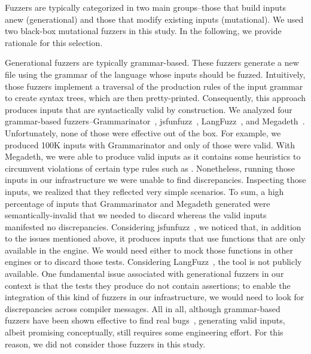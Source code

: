 \documentclass[10pt,conference,anonymous]{IEEEtran}
\begin{document}

Fuzzers are typically categorized in two main groups--those that build
inputs anew (generational) and those that modify existing inputs
(mutational). We used two black-box mutational
fuzzers
in this study. In the following, we provide rationale for this
selection.

Generational fuzzers are typically grammar-based. These fuzzers
generate a new file using the grammar of the language whose inputs
should be fuzzed. Intuitively, those fuzzers implement a traversal of
the production rules of the input grammar to create syntax trees,
which are then pretty-printed. Consequently, this approach produces
inputs that are syntactically valid by construction. We analyzed four
grammar-based fuzzers--Grammarinator~\cite{grammarinator},
jsfunfuzz~\cite{jsfunfuzz},
LangFuzz~\cite{Holler:2012:FCF:2362793.2362831}, and
Megadeth~\cite{grieco2016quickfuzz}.  Unfortunately, none of those
were effective out of the box. For example, we produced 100K inputs
with Grammarinator and only  of those were valid. With
Megadeth, we were able to produce   valid inputs as it
contains some heuristics to circumvent violations of certain type
rules such as . Nonetheless,
running those inputs in our infrastructure we were unable to find
discrepancies. Inspecting those inputs, we realized that they reflected
very simple scenarios. To sum, a high percentage of inputs that
Grammarinator and Megadeth generated were semantically-invalid that we
needed to discard whereas the valid inputs manifested no
discrepancies. Considering jsfunfuzz~\cite{jsfunfuzz}, we noticed
that, in addition to the issues mentioned above, it produces inputs
that use functions that are only available in the \smonkey{}
engine. We would need either to mock those functions in other engines
or to discard those tests. Considering
LangFuzz~\cite{Holler:2012:FCF:2362793.2362831}, the tool is not
publicly available. One fundamental issue associated with generational
fuzzers in our context is that the tests they produce do not contain
assertions; to enable the integration of this kind of fuzzers in our
infrastructure, we would need to look for discrepancies across
compiler messages.  All in all, although grammar-based fuzzers have
been shown effective to find real
bugs~\cite{Holler:2012:FCF:2362793.2362831}, generating valid inputs,
albeit promising conceptually, still requires some engineering
effort. For this reason, we did not consider those fuzzers in this
study.
\end{document}
